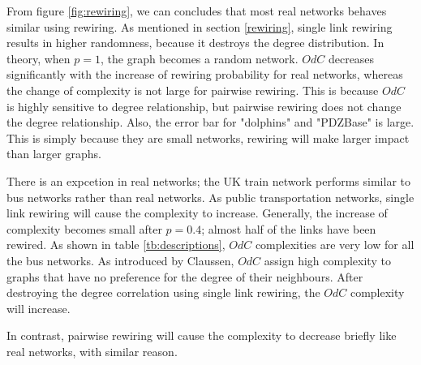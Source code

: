 \documentclass[12pt]{article}
\begin{document}
\noindent
From figure \ref{fig:rewiring}, we can concludes that most real networks behaves similar using rewiring. As mentioned in section \ref{rewiring}, single link rewiring results in higher randomness, because it destroys the degree distribution. In theory, when $p=1$, the graph becomes a random network. $OdC$ decreases significantly with the increase of rewiring probability for real networks, whereas the change of complexity is not large for pairwise rewiring. This is because $OdC$ is highly sensitive to degree relationship, but pairwise rewiring does not change the degree relationship. Also, the error bar for "dolphins" and "PDZBase" is large. This is simply because they are small networks, rewiring will make larger impact than larger graphs.\par
There is an expcetion in real networks; the UK train network performs similar to bus networks rather than real networks. As public transportation networks, single link rewiring will cause the complexity to increase. Generally, the increase of complexity becomes small after $p=0.4$; almost half of the links have been rewired. As shown in table \ref{tb:descriptions}, $OdC$ complexities are very low for all the bus networks. As introduced by Claussen\cite{odc}, $OdC$ assign high complexity to graphs that have no preference for the degree of their neighbours. After destroying the degree correlation using single link rewiring, the $OdC$ complexity will increase.\par
In contrast, pairwise rewiring will cause the complexity to decrease briefly like real networks, with similar reason.
\end{document}
